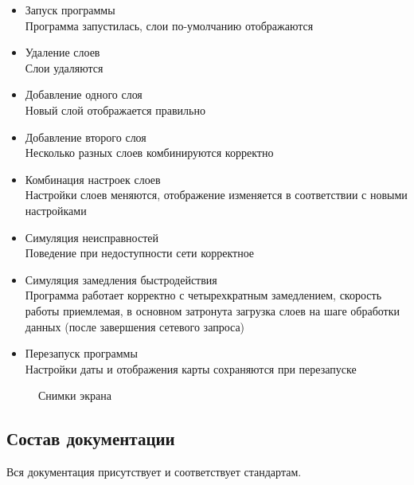 \documentclass[a4paper, 12pt]{article}
\begin{document}
	\begin{itemize}
		\item Запуск программы \\ Программа запустилась, слои по-умолчанию отображаются
		\item Удаление слоев \\ Слои удаляются
		\item Добавление одного слоя \\ Новый слой отображается правильно
		\item Добавление второго слоя \\ Несколько разных слоев комбинируются корректно
		\item Комбинация настроек слоев \\ Настройки слоев меняются, отображение изменяется в соответствии с новыми настройками
		\item Симуляция неисправностей \\ Поведение при недоступности сети корректное
		\item Симуляция замедления быстродействия \\ Программа работает корректно с четырехкратным замедлением, скорость работы приемлемая, в основном затронута загрузка слоев на шаге обработки данных (после завершения сетевого запроса)
		\item Перезапуск программы \\ Настройки даты и отображения карты сохраняются при перезапуске
	\end{itemize}

	\begin{figure}[htbp]
		\centering
		\caption{Снимки экрана}
	\end{figure}
	
	\subsection{Состав документации}
	Вся документация присутствует и соответствует стандартам.
\end{document}
